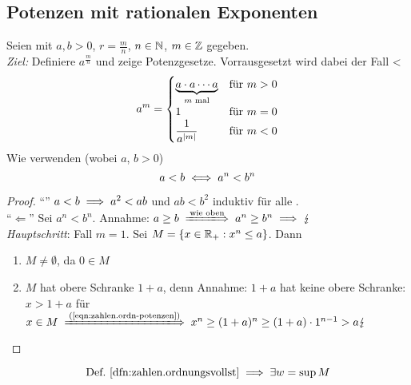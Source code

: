 \documentclass[12pt]{scrreprt}
\begin{document}
\subsection*{Potenzen mit rationalen Exponenten}
Seien  mit $a, b > 0$, $r=\frac{m}{n}$, $n\in\mathbb{N}$, $m\in\mathbb{Z}$ gegeben.\\
\emph{Ziel:} Definiere $a^\frac{m}{n}$ und zeige Potenzgesetze. Vorrausgesetzt wird dabei der Fall
<\[a^m =
\begin{cases}
\underbrace{a \cdot a \dotsm a}_{m\text{ mal}} &\text{für }m>0\\
1 &\text{für }m=0\\
\displaystyle\frac{1}{a^{\left\lvert m\right\lvert}} &\text{für }m<0
\end{cases}\]
Wie verwenden (wobei $a$, $b > 0$)
\begin{equation} 
a<b \iff a^n <  b^n 
\label{eqn:zahlen.ordn-potenzen}
\end{equation}
\begin{proof}
"`\folgt"' $a<b \implies a^2 < ab$ und $ab < b^2$ induktiv für alle .\\
"`$\Longleftarrow$"' Sei $a^n < b^n$. Annahme: $a \ge b \folgtwegen{\text{wie oben}} a^n \ge b^n \folgt \blitz$\\
\emph{Hauptschritt}: Fall $m=1$. Sei $M = \{ x \in \mathbb{R}_+ : x^n \le a \}$. Dann
\begin{enumerate}
\item $M \ne \emptyset$, da $0 \in M$
\item $M$ hat obere Schranke $1+a$, denn Annahme: $1+a$ hat keine 
obere Schranke: $x>1+a$ für $x \in M \folgtnach{(\ref{eqn:zahlen.ordn-potenzen})} 
x^n \ge (1+a)^n\ge (1+a)\cdot 1^{n-1} > a \blitz$
\end{enumerate}
\end{proof}

\begin{equation}
\text{Def.~\ref{dfn:zahlen.ordnungsvollst}} \implies \exists w = \sup M
\label{eqn:zahlen.exist-wurzel}
\end{equation}
\end{document}
